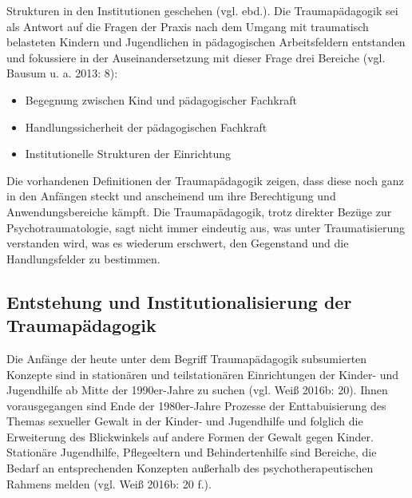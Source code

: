 Strukturen in den Institutionen geschehen (vgl. ebd.). Die Traumapädagogik sei als Antwort auf die Fragen der Praxis nach dem Umgang mit traumatisch belasteten Kindern und Jugendlichen in pädagogischen Arbeitsfeldern entstanden und fokussiere in der Auseinandersetzung mit dieser Frage drei Bereiche (vgl. Bausum u. a. 2013: 8):

\begin{itemize}
\item Begegnung zwischen Kind und pädagogischer Fachkraft 
\item Handlungssicherheit der pädagogischen Fachkraft 
\item Institutionelle Strukturen der Einrichtung
\end{itemize}

Die vorhandenen Definitionen der Traumapädagogik zeigen, dass diese noch ganz in den Anfängen steckt und anscheinend um ihre Berechtigung und Anwendungsbereiche kämpft. Die Traumapädagogik, trotz direkter Bezüge zur Psychotraumatologie, sagt nicht immer eindeutig aus, was unter Traumatisierung verstanden wird, was es wiederum erschwert, den Gegenstand und die Handlungsfelder zu bestimmen.

\subsection{Entstehung und Institutionalisierung der Traumapädagogik}
Die Anfänge der heute unter dem Begriff Traumapädagogik subsumierten Konzepte sind in stationären und teilstationären Einrichtungen der Kinder- und Jugendhilfe ab Mitte der 1990er-Jahre zu suchen (vgl. Weiß 2016b: 20). Ihnen vorausgegangen sind Ende der 1980er-Jahre Prozesse der Enttabuisierung des Themas sexueller Gewalt in der Kinder- und Jugendhilfe und folglich die Erweiterung des Blickwinkels auf andere Formen der Gewalt gegen Kinder. Stationäre Jugendhilfe, Pflegeeltern und Behindertenhilfe sind Bereiche, die Bedarf an entsprechenden Konzepten außerhalb des psychotherapeutischen Rahmens melden (vgl. Weiß 2016b: 20 f.).

